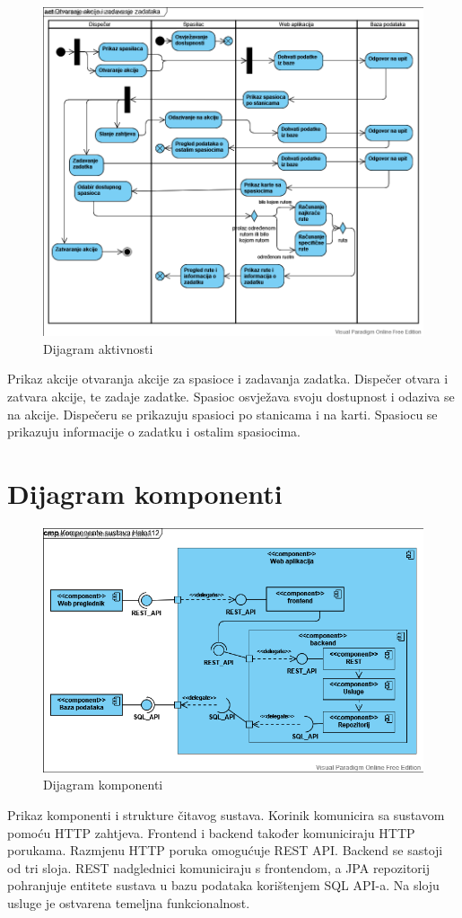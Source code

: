 			\begin{figure}[H]
				\includegraphics[scale=0.5]{slike/act.png}
				\centering
				\caption{Dijagram aktivnosti}
				\label{fig:act}
			\end{figure}
			Prikaz akcije otvaranja akcije za spasioce i zadavanja zadatka. Dispečer otvara i zatvara akcije, te zadaje zadatke. Spasioc osvježava svoju dostupnost i odaziva se na akcije. Dispečeru se prikazuju spasioci po stanicama i na karti. Spasiocu se prikazuju informacije o zadatku i ostalim spasiocima.
			\eject
			
		\section{Dijagram komponenti}
		
			\begin{figure}[H]
				\includegraphics[scale=0.6]{slike/cmp.png}
				\centering
				\caption{Dijagram komponenti}
				\label{fig:cmp}
			\end{figure}
			Prikaz komponenti i strukture čitavog sustava. Korinik komunicira sa sustavom pomoću HTTP zahtjeva. Frontend i backend također komuniciraju HTTP porukama. Razmjenu HTTP poruka omogućuje REST API. Backend se sastoji od tri sloja. REST nadglednici komuniciraju s frontendom, a JPA repozitorij pohranjuje entitete sustava u bazu podataka korištenjem SQL API-a. Na sloju usluge je ostvarena temeljna funkcionalnost.